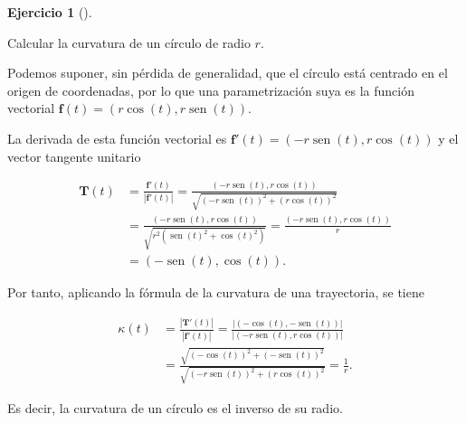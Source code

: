 \documentclass[
  spanish,
  a4paper,
]{scrreport}
\theoremstyle{definition}
\newtheorem{exercise}{Ejercicio}[chapter]
\theoremstyle{remark}
\begin{document}
\begin{exercise}[]\protect\hypertarget{exr-curvatura-circulo}{}\label{exr-curvatura-circulo}

Calcular la curvatura de un círculo de radio \(r\).

\end{exercise}

\begin{tcolorbox}[enhanced jigsaw, arc=.35mm, bottomrule=.15mm, bottomtitle=1mm, breakable, colback=white, colbacktitle=quarto-callout-tip-color!10!white, colframe=quarto-callout-tip-color-frame, coltitle=black, left=2mm, leftrule=.75mm, opacityback=0, opacitybacktitle=0.6, rightrule=.15mm, title=\textcolor{quarto-callout-tip-color}{\faLightbulb}\hspace{0.5em}{Solución}, titlerule=0mm, toprule=.15mm, toptitle=1mm]

Podemos suponer, sin pérdida de generalidad, que el círculo está
centrado en el origen de coordenadas, por lo que una parametrización
suya es la función vectorial
\(\mathbf{f}(t) = (r\cos(t),r\operatorname{sen}(t))\).

La derivada de esta función vectorial es
\(\mathbf{f}'(t)= (-r\operatorname{sen}(t), r\cos(t))\) y el vector
tangente unitario

\begin{align*}
\mathbf{T}(t) 
&= \frac{\mathbf{f}'(t)}{|\mathbf{f}'(t)|}
= \frac{(-r\operatorname{sen}(t), r\cos(t))}{\sqrt{(-r\operatorname{sen}(t))^2 +(r\cos(t))^2}} \\
&= \frac{(-r\operatorname{sen}(t), r\cos(t))}{\sqrt{r^2(\operatorname{sen}(t)^2 +\cos(t)^2)}}
=\frac{(-r\operatorname{sen}(t), r\cos(t))}{r} \\
&= (-\operatorname{sen}(t), \cos(t)).
\end{align*}

Por tanto, aplicando la fórmula de la curvatura de una trayectoria, se
tiene

\begin{align*}
\kappa(t) 
&= \frac{|\mathbf{T}'(t)|}{|\mathbf{f}'(t)|} 
= \frac{|(-\cos(t), -\operatorname{sen}(t))|}{|(-r\operatorname{sen}(t), r\cos(t))|} \\
&= \frac{\sqrt{(-\cos(t))^2+(-\operatorname{sen}(t))^2}}{\sqrt{(-r\operatorname{sen}(t))^2 +(r\cos(t))^2}}
= \frac{1}{r}.
\end{align*}

Es decir, la curvatura de un círculo es el inverso de su radio.

\end{tcolorbox}
\end{document}
